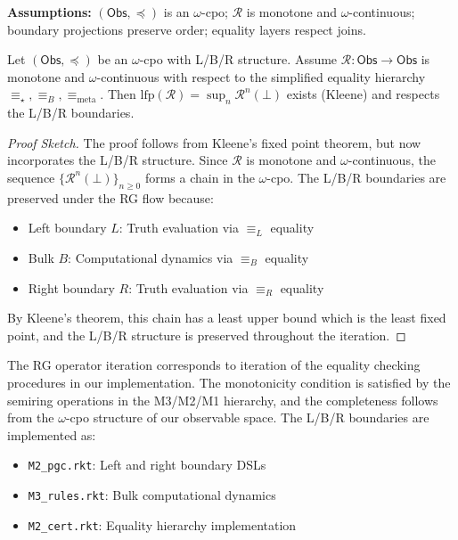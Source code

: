 \begin{notation}[Hypotheses]
\label{not:hypotheses-truth}
\textbf{Assumptions:} $(\mathsf{Obs},\preceq)$ is an $\omega$-cpo; $\mathcal{R}$ is monotone and $\omega$-continuous; boundary projections preserve order; equality layers respect joins.
\end{notation}

\begin{theorem}
\label{thm:truth-fixed-point-lbr}
Let $(\mathsf{Obs},\preceq)$ be an $\omega$-cpo with L/B/R structure. Assume $\mathcal{R}:\mathsf{Obs}\to\mathsf{Obs}$ is monotone and $\omega$-continuous with respect to the simplified equality hierarchy $\equiv_\star, \equiv_B, \equiv_{\text{meta}}$. Then $\mathrm{lfp}(\mathcal{R})=\sup_n \mathcal{R}^n(\bot)$ exists (Kleene) and respects the L/B/R boundaries.
\end{theorem}

\begin{proof}[Proof Sketch]
The proof follows from Kleene's fixed point theorem, but now incorporates the L/B/R structure. Since $\mathcal{R}$ is monotone and $\omega$-continuous, the sequence $\{\mathcal{R}^n(\bot)\}_{n \geq 0}$ forms a chain in the $\omega$-cpo. The L/B/R boundaries are preserved under the RG flow because:
\begin{itemize}
\item Left boundary $L$: Truth evaluation via $\equiv_L$ equality
\item Bulk $B$: Computational dynamics via $\equiv_B$ equality  
\item Right boundary $R$: Truth evaluation via $\equiv_R$ equality
\end{itemize}
By Kleene's theorem, this chain has a least upper bound which is the least fixed point, and the L/B/R structure is preserved throughout the iteration.
\end{proof}

\begin{remark}
\label{rem:implementation-connection-lbr}
The RG operator iteration corresponds to iteration of the equality checking procedures in our implementation. The monotonicity condition is satisfied by the semiring operations in the M3/M2/M1 hierarchy, and the completeness follows from the $\omega$-cpo structure of our observable space. The L/B/R boundaries are implemented as:
\begin{itemize}
\item \texttt{M2\_pgc.rkt}: Left and right boundary DSLs
\item \texttt{M3\_rules.rkt}: Bulk computational dynamics
\item \texttt{M2\_cert.rkt}: Equality hierarchy implementation
\end{itemize}
\end{remark}

